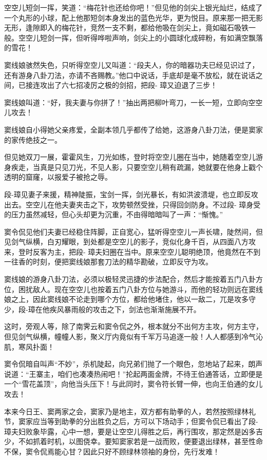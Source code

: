 \documentclass[12pt,oneside]{book}
\begin{document}
空空儿短剑一挥，笑道：``梅花针也还给你吧！''但见他的剑尖上银光灿烂，结成了一个丸形的小球，配上他那短剑本身发出的蓝色光华，更为悦目。原来那一把无影无形，逢隙即入的梅花针，竞然一支不剩，都给他吸在剑尖上，竟如磁石吸铁一般。空空儿短剑一挥，但听得哗啦声响，剑尖上的小圆球化成碎粉，有如满空飘落的雪花！

窦线娘骇然失色，只听得空空儿又叫道：``段夫人，你的暗器功夫已经见识过了，还有游身八卦刀法，亦请不吝赐教。''他口中说话，手底却是毫不放松，就在说话之间，已接连攻出了六七招凌厉之极的剑招，把段-
璋又迫退了三步！

窦线娘叫道：``好，我夫妻与你拼了！''抽出两把柳叶弯刀，一长一短，立即向空空儿攻去！

窦线娘自小得她父亲疼爱，全副本领几乎都传了给她，这游身八卦刀法，便是窦家的家传绝技之一。

但见她双刀一展，霍霍风生，刀光如练，登时将空空儿圈在当中，她随着空空儿游身疾走，当真是只见刀光，不见人影，只要空空儿稍有疏漏，她就要在他身上戳个透明的窟窿，以报爱子被抢之辱。

段-璋见妻子来援，精神陡振，宝剑一挥，剑光暴长，有如洪波溃堤，也立即反攻出去。空空儿在他夫妻夹击之下，攻势顿然受挫，只得回剑防身。不过段-
璋身受的压力虽然减轻，但心头却更为沉重，不由得暗暗叫了一声：``惭愧。''

窦令侃见他们夫妻已经稳住阵脚，正自宽心，猛听得空空儿一声长啸，陡然间，但见剑气纵横，白刃耀眼，到处都是空空儿的影子，竞似化身千百，从四面八方攻来，登时反客为主，把段-
璋夫妇圈在当中。原来空空儿聪明绝顶，他竟然在不到一往香的时刻，便把窦线娘那套刀法的精华勘破，立即反守为攻。

窦线娘的游身八卦刀法，必须以极轻灵迅捷的步法配合，然后才能按着五门八卦方位，困扰敌人。现在空空儿也按着五门八卦方位与她游斗，而他的轻功则远在窦线娘之上，因此窦线娘不论走到哪个方位，都给他堵住，他以一敌二，兀是攻多守少，段-璋在他疾风暴雨般的攻击之下，剑法也渐渐施展不开。

这时，旁观人等，除了南霁云和窦令侃之外，根本就分不出何方主攻，何方主守，但见剑气纵横，幢幢人影，聚义厅内竟似有千军万马追逐一般！人人都感到冷气沁肌，寒风扑面！

窦令侃暗自叫声``不妙''，杀机陡起，向兄弟们抛了一个眼色，忽地站了起来，朗声说道：``王寨主，咱们也凑凑热闹吧！''抡起两面金牌，不待王伯通答话，立即便是一个``雪花盖顶''，向他当头压下！与此同时，窦令符长臂一伸，也向王伯通的女儿攻去！

本来今日王、窦两家之会，窦家乃是地主，双方都有助拳的人，若然按照绿林礼节，窦家应当等到助拳的分出胜负之后，方可以下场动手；但窦令侃已看出了段-
璋夫妇败象毕露，心中一想，要是让空空儿得胜之后，再行围攻，那定然是凶多吉少，不如抓着时机，以图侥幸。要知窦家若是一战而败，便要退出绿林，甚至性命不保，窦令侃焉能心甘？因此只好不顾绿林领袖的身份，先行发难！
\end{document}
